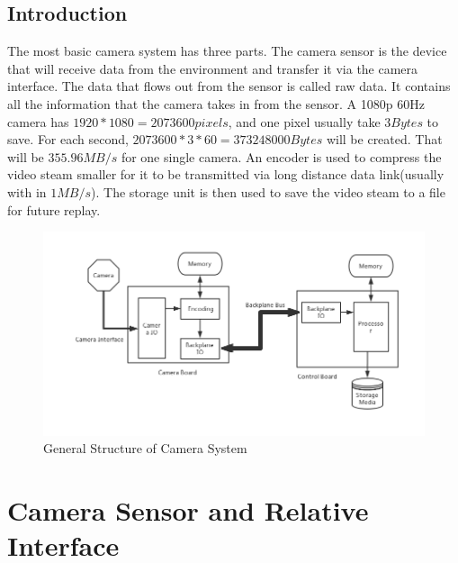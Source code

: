 \documentclass[12pt,article]{memoir}
\begin{document}
\section{Introduction}
The most basic camera system has three parts. The camera sensor is the device that will receive data from the environment and transfer it via the camera interface. The data that flows out from the sensor is called raw data. It contains all the information that the camera takes in from the sensor. A 1080p 60Hz camera has $1920*1080=2073600 pixels$, and one pixel usually take $3 Bytes$ to save. For each second, $2073600*3*60=373248000Bytes$ will be created. That will be $355.96MB/s$ for one single camera. An encoder is used to compress the video steam smaller for it to be transmitted via long distance data link(usually with in $1MB/s$).\cite{zhidao:Video} The storage unit is then used to save the video steam to a file for future replay.
\begin{figure}[htp]
\includegraphics[width=\textwidth]{img/DR00002_GenDia.png}
 \caption{General Structure of Camera System}	
\end{figure}
\newpage
%
\chapter{Camera Sensor and Relative Interface}
\end{document}
